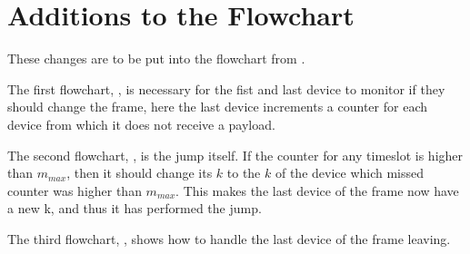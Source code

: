 \section{Additions to the Flowchart}
These changes are to be put into the flowchart from .

The first flowchart, , is necessary for the fist and last device to monitor if they should change the frame, here the last device increments a counter for each device from which it does not receive a payload.

The second flowchart, , is the jump itself.
If the counter for any timeslot is higher than $m_{max}$, then it should change its $k$ to the $k$ of the device which missed counter was higher than $m_{max}$.
This makes the last device of the frame now have a new k, and thus it has performed the jump.	

The third flowchart, , shows how to handle the last device of the frame leaving.
